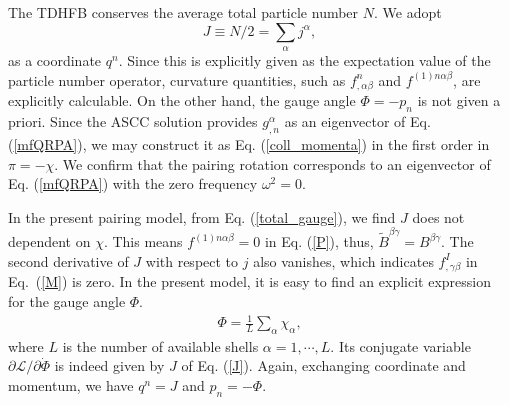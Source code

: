 \documentclass[%
superscriptaddress,
showpacs,
nofootinbib,
amsmath,amssymb,
aps,
prc,
twocolumn,
floatfix ]%
{revtex4-1}
\begin{document}
The TDHFB conserves the average total particle number $N$.
We adopt 
\begin{equation}
	J\equiv N/2=\sum_\alpha j^\alpha ,
  \label{J}
\end{equation}
as a coordinate $q^n$.
Since this is explicitly given as the expectation value of the particle
number operator, curvature quantities,
such as $f^n_{,\alpha\beta}$ and $f^{(1)n\alpha\beta}$,
are explicitly calculable.
On the other hand, the gauge angle $\Phi=-p_n$ is not given a priori.
Since the ASCC solution provides $g^\alpha_{,n}$ as an eigenvector of
Eq. (\ref{mfQRPA}),
we may construct it as Eq. (\ref{coll_momenta}) in the first order
in $\pi=-\chi$.
We confirm that the pairing rotation corresponds to an eigenvector
of Eq. (\ref{mfQRPA}) with the zero frequency $\omega^2=0$.



In the present pairing model, 
from Eq. (\ref{total_gauge}), we find $J$ does not dependent on $\chi$.
This means $f^{(1)n\alpha\beta}=0$ in Eq. (\ref{P}),
thus, $\tilde{B}^{\beta\gamma}=B^{\beta\gamma}$.
The second derivative of $J$ with respect to $j$ also vanishes,
which indicates $f^{I}_{,\gamma\beta}$ in Eq.~(\ref{M}) is zero. 
In the present model, it is easy to find an explicit expression
for the gauge angle $\Phi$.
\begin{align}
  \Phi = \frac{1}{L}\sum_{\alpha} \chi_{\alpha},
  \label{total_gauge}
\end{align}
where $L$ is the number of available shells $\alpha=1,\cdots,L$.
Its conjugate variable
${\partial\mathcal{L}}/{\partial\dot{\Phi}}$
is indeed given by $J$ of Eq. (\ref{J}).
Again, exchanging coordinate and momentum,
we have $q^n=J$ and $p_n=-\Phi$.
\end{document}
